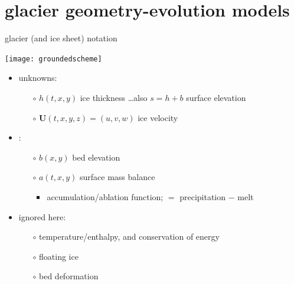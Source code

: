 \documentclass{beamer}
\newcommand\bU{\mathbf{U}}
\begin{document}

\section{glacier geometry-evolution models}

\begin{frame}{glacier (and ice sheet) notation}

\begin{center}
\texttt{[image: groundedscheme]}
\end{center}

\begin{itemize}
\item unknowns:
  \begin{itemize}
  \item[$\circ$]  $h(t,x,y)$ ice thickness \hfill \dots also $s=h+b$ surface elevation
  \item[$\circ$]  $\bU(t,x,y,z) = (u,v,w)$ ice velocity
  \end{itemize}
\item {}:
  \begin{itemize}
  \item[$\circ$]  $b(x,y)$ bed elevation 
  \item[$\circ$]  $a(t,x,y)$ surface mass balance  
    \begin{itemize}
    \item accumulation/ablation function; $=$ precipitation $-$ melt
    \end{itemize}
  \end{itemize}
\item ignored here:
  \begin{itemize}
  \item[$\circ$]  temperature/enthalpy, and conservation of energy
  \item[$\circ$]  floating ice
  \item[$\circ$]  bed deformation
  \end{itemize}
\end{itemize}
\end{frame}
\end{document}

